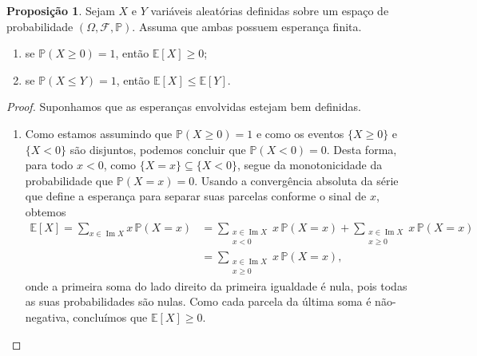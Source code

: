 \documentclass[12pt,portuguese]{article}
\theoremstyle{definition}
\newtheorem{proposition}[proposition]{Proposição}
\begin{document}
\begin{proposition}
Sejam $X$ e $Y$ variáveis aleatórias definidas sobre um espaço de probabilidade $(\Omega,\mathcal{F},\mathbb{P})$.
Assuma que ambas possuem esperança finita.
\begin{enumerate}[label=(\alph*)]
\item se $\mathbb{P}(X\geqslant 0)=1$, então $\mathbb{E}[X]\geqslant 0$;
\item se $\mathbb{P}(X\leqslant Y)=1$, então $\mathbb{E}[X]\leqslant \mathbb{E}[Y]$. 
\end{enumerate}

\end{proposition}

\begin{proof}
Suponhamos que as esperanças envolvidas estejam bem definidas.
\begin{enumerate}[label=(\alph*)]
\item Como estamos assumindo que $\mathbb{P}(X\geqslant 0)=1$ e 
como os eventos $\{X\geqslant 0\}$ e $\{X<0\}$ são disjuntos,
podemos concluir que $\mathbb{P}(X<0)=0$. Desta forma, para todo $x<0$, como $\{X=x\}\subseteq \{X<0\}$,
segue da monotonicidade da probabilidade que $\mathbb{P}(X=x)=0$. Usando a convergência absoluta
da série que define a esperança para separar suas parcelas conforme o sinal de $x$, obtemos
\begin{align*}
\mathbb{E}[X]
=
\sum_{x \in \operatorname{Im} X} x\,\mathbb{P}(X=x)
&=
\sum_{\substack{x \in \operatorname{Im} X \\ x< 0}} x\,\mathbb{P}(X=x)
+
\sum_{\substack{x \in \operatorname{Im} X \\ x\geqslant 0}} x\,\mathbb{P}(X=x)
\\[0.4cm]
&=
\sum_{\substack{x \in \operatorname{Im} X \\ x\geqslant 0}} x\,\mathbb{P}(X=x),
\end{align*}
onde a primeira soma do lado direito da primeira igualdade é nula, pois todas as suas probabilidades
são nulas. Como cada parcela da última soma é não-negativa, concluímos que $\mathbb{E}[X]\geqslant 0$.


\end{enumerate}
\end{proof}
\end{document}
